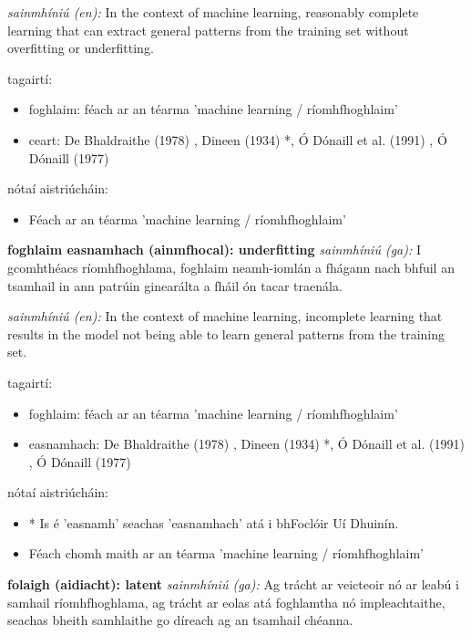 \documentclass{article}
\begin{document}
\textit{sainmhíniú (en):} In the context of machine learning, reasonably complete learning that can extract general patterns from the training set without overfitting or underfitting.

tagairtí:
\begin{itemize}
	\item foghlaim: féach ar an téarma 'machine learning / ríomhfhoghlaim'
	\item ceart: De Bhaldraithe (1978) \cite{de-bhaldraithe}, Dineen (1934) \cite{dineen}*, Ó Dónaill et al. (1991) \cite{focloir-beag}, Ó Dónaill (1977) \cite{odonaill}
\end{itemize}

nótaí aistriúcháin:
\begin{itemize}
	\item Féach ar an téarma 'machine learning / ríomhfhoghlaim'
\end{itemize}


\textbf{foghlaim easnamhach (ainmfhocal): underfitting}
\textit{sainmhíniú (ga):} I gcomhthéacs ríomhfhoghlama, foghlaim neamh-iomlán a fhágann nach bhfuil an tsamhail in ann patrúin ginearálta a fháil ón tacar traenála.

\textit{sainmhíniú (en):} In the context of machine learning, incomplete learning that results in the model not being able to learn general patterns from the training set.

tagairtí:
\begin{itemize}
	\item foghlaim: féach ar an téarma 'machine learning / ríomhfhoghlaim'
	\item easnamhach: De Bhaldraithe (1978) \cite{de-bhaldraithe}, Dineen (1934) \cite{dineen}*, Ó Dónaill et al. (1991) \cite{focloir-beag}, Ó Dónaill (1977) \cite{odonaill}
\end{itemize}

nótaí aistriúcháin:
\begin{itemize}
	\item * Is é 'easnamh' seachas 'easnamhach' atá i bhFoclóir Uí Dhuinín.
	\item Féach chomh maith ar an téarma 'machine learning / ríomhfhoghlaim'
\end{itemize}


\textbf{folaigh (aidiacht): latent}
\textit{sainmhíniú (ga):} Ag trácht ar veicteoir nó ar leabú i samhail ríomhfhoghlama, ag trácht ar eolas atá foghlamtha nó impleachtaithe, seachas bheith samhlaithe go díreach ag an tsamhail chéanna.
\end{document}
